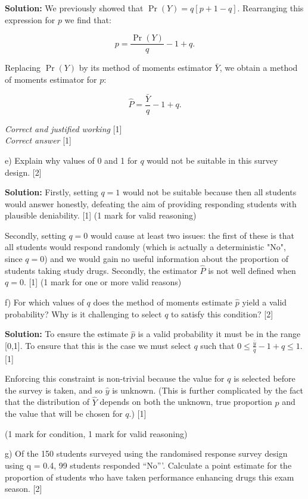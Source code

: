 \documentclass[a4paper, 11pt]{article}
\begin{document}
{\color{blue}
\textbf{Solution:}
%
We previously showed that $ \Pr(Y) = q [p + 1 - q]$. Rearranging this expression for $p$ we find that: 

$$ p = \frac{\Pr(Y)}{q} - 1 + q.$$ 

Replacing $\Pr(Y)$ by its method of moments estimator $\bar Y$, we obtain a method of moments estimator for $p$:

$$ \hat P = \frac{\bar Y}{q} - 1 + q.$$

\textit{Correct and justified working } [1] \\
\textit{Correct answer} [1] 
}

e) Explain why values of  0 and 1 for $q$ would not be suitable in this survey design. [2]

{\color{blue}
\textbf{Solution:}
%
Firstly, setting $q = 1$ would not be suitable because then all students would answer honestly, defeating the aim of providing responding students with plausible deniability. [1] (1 mark for valid reasoning)

Secondly, setting $q = 0$ would cause at least two issues:  the first of these is that all students would respond randomly (which is actually a deterministic "No", since $q=0$) and we would gain no useful information about the proportion of students taking study drugs. Secondly, the estimator $\hat P$ is not well defined when $q = 0$. [1] (1 mark for one or more valid reasons)
}

f)  For which values of $q$ does the method of moments estimate $\hat p$ yield a valid probability? Why is it challenging to select $q$ to satisfy this condition? [2] 

{\color{blue}
\textbf{Solution:}
%
To ensure the estimate $\hat p$ is a valid probability it must be in the range [0,1]. To ensure that this is the case we must select $q$ such that $0 \leq \frac{\bar y}{q} - 1 + q \leq 1$. [1]

Enforcing this constraint is non-trivial because the value for $q$ is selected before the survey is taken, and so $\hat y$ is unknown.  (This is further complicated by the fact that the distribution of $\hat Y$ depends  on both the unknown, true proportion $p$ and the value that will be chosen for $q$.) [1] 

(1 mark for condition, 1 mark for valid reasoning)
}

g) Of the 150 students surveyed using the randomised response survey design using q = 0.4, 99 students responded ``No'''. Calculate a point estimate for the proportion of students who have taken performance enhancing drugs this exam season. [2]
\end{document}
